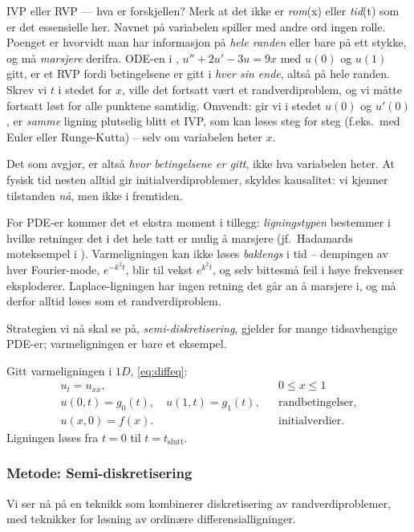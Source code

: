 \begin{rem}{IVP eller RVP — hva er forskjellen? }
Merk at det ikke er \emph{rom}(x) eller \emph{tid}(t) som er det essensielle her. Navnet på variabelen spiller med andre ord ingen rolle. Poenget er hvorvidt man har informasjon på \emph{hele randen} eller bare på ett stykke, og må \emph{marsjere} derifra. ODE-en i , $u''+2u'-3u=9x$ med $u(0)$ og $u(1)$ gitt, er et RVP fordi betingelsene er gitt i \emph{hver sin ende}, altså på hele randen. Skrev vi $t$ i stedet for $x$, ville det fortsatt vært et randverdiproblem, og vi måtte fortsatt løst for alle punktene samtidig. Omvendt: gir vi i stedet $u(0)$ og $u'(0)$, er \emph{samme} ligning plutselig blitt et IVP, som kan løses steg for steg (f.eks.\ med Euler eller Runge-Kutta) -- selv om variabelen heter $x$.

\medskip
Det som avgjør, er altså \emph{hvor betingelsene er gitt}, ikke hva variabelen heter. At fysisk tid nesten alltid gir initialverdiproblemer, skyldes kausalitet: vi kjenner tilstanden \emph{nå}, men ikke i fremtiden.

\medskip
For PDE-er kommer det et ekstra moment i tillegg: \emph{ligningstypen} bestemmer i hvilke retninger det i det hele tatt er mulig å marsjere (jf.\ Hadamards moteksempel i ). Varmeligningen kan ikke løses \emph{baklengs} i tid -- dempingen av hver Fourier-mode, $e^{-k^2t}$, blir til vekst $e^{k^2t}$, og selv bittesmå feil i høye frekvenser eksploderer. Laplace-ligningen har ingen retning det går an å marsjere i, og må derfor alltid løses som et randverdiproblem.
\end{rem}

Strategien vi nå skal se på, \textit{semi-diskretisering}, gjelder for mange tidsavhengige PDE-er; varmeligningen er bare et eksempel.

Gitt varmeligningen i $1D$, \eqref{eq:diffeq}:
\begin{align*}
u_t = u_{xx}, && 0 \leq x \leq 1 \\
u(0, t) = g_0(t), \quad u(1, t) = g_1(t), && \text{randbetingelser},\\
u(x, 0) = f(x). && \text{initialverdier}.
\end{align*}
Ligningen løses fra \( t = 0 \) til \( t = t_{\text{slutt}} \).

\subsubsection*{Metode: Semi-diskretisering}
Vi ser nå på en teknikk som kombinerer diskretisering av randverdiproblemer, med teknikker for løsning av ordinære differensialligninger.

